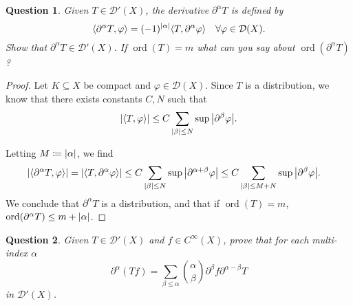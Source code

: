 \documentclass{article}
\theoremstyle{plain}
\newtheorem{question}{Question}
\theoremstyle{remark}
\renewcommand{\phi}{\varphi}
\newcommand{\Cal}{\mathcal}
\newcommand{\DD}{\Cal D}
\DeclarePairedDelimiter{\ang}{\langle}{\rangle}
\newcommand\ceq\coloneqq %
\newcommand\pt\partial
\DeclareMathOperator{\ord}{ord}
\begin{document}
\begin{question}
	Given $T \in \DD'(X)$, the derivative $\pt^\alpha T$ is defined by
	\[
	\ang{\pt^\alpha T, \phi} = (-1)^\abs{\alpha} \ang{T, \pt^\alpha\phi} \quad \forall \phi \in \DD(X). 
	\]
	Show that $\pt^\alpha T \in \DD'(X)$. If $\ord(T) = m$ what can you say about $\ord(\pt^\alpha T)$? 
\end{question}

\begin{proof}
	Let $K \subseteq X$ be compact and $\phi \in \DD(X)$. Since $T$ is a distribution, we know that there exists constants $C, N$ such that
	\[
	\abs{\ang{T, \phi}} \leq C \sum_{\abs{\beta} \leq N} \sup \abs{\pt^\beta \phi}. 
	\]
	
	Letting $M \ceq \abs{\alpha}$, we find
		\begin{align*}
		\abs{\ang{\pt^\alpha T, \phi}} &= \abs{\ang{T, \pt^\alpha\phi}} \leq C \sum_{\abs{\beta} \leq N} \sup \abs{\pt^{\alpha + \beta}\phi} \leq C \sum_{\abs{\beta} \leq M + N} \sup \abs{\pt^\beta \phi}.
	\end{align*}
We conclude that $\pt^\alpha T$ is a distribution, and that if $\ord(T) = m$, $\ord(\pt^\alpha T) \leq m + \abs{\alpha}$. 
\end{proof}

\begin{question}
	Given $T \in \DD'(X)$ and $f \in C^\infty(X)$, prove that for each multi-index $\alpha$
	\[
	\pt^\alpha(Tf) = \sum_{\beta \leq \alpha} \binom{\alpha}{\beta} \pt^\beta f \pt^{\alpha - \beta}T
	\]
	in $\DD'(X)$. 
\end{question}
\end{document}
